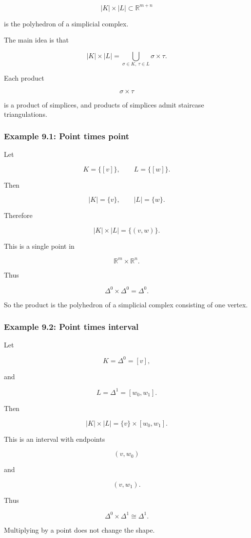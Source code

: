 \documentclass[12pt,a4paper]{article}
\theoremstyle{notespace}
\begin{document}
\[
|K|\times |L|
\subset
\mathbb R^{m+n}
\]

is the polyhedron of a simplicial complex.

The main idea is that

\[
|K|\times |L|
=
\bigcup_{\sigma\in K,\ \tau\in L}
\sigma\times \tau.
\]

Each product

\[
\sigma\times \tau
\]

is a product of simplices, and products of simplices admit staircase triangulations.

\subsubsection{Example 9.1: Point times point}

Let

\[
K=\{[v]\},
\qquad
L=\{[w]\}.
\]

Then

\[
|K|=\{v\},
\qquad
|L|=\{w\}.
\]

Therefore

\[
|K|\times |L|
=
\{(v,w)\}.
\]

This is a single point in

\[
\mathbb R^m\times \mathbb R^n.
\]

Thus

\[
\Delta^0\times \Delta^0=\Delta^0.
\]

So the product is the polyhedron of a simplicial complex consisting of one vertex.

\subsubsection{Example 9.2: Point times interval}

Let

\[
K=\Delta^0=[v],
\]

and

\[
L=\Delta^1=[w_0,w_1].
\]

Then

\[
|K|\times |L|
=
\{v\}\times [w_0,w_1].
\]

This is an interval with endpoints

\[
(v,w_0)
\]

and

\[
(v,w_1).
\]

Thus

\[
\Delta^0\times \Delta^1\cong \Delta^1.
\]

Multiplying by a point does not change the shape.
\end{document}
